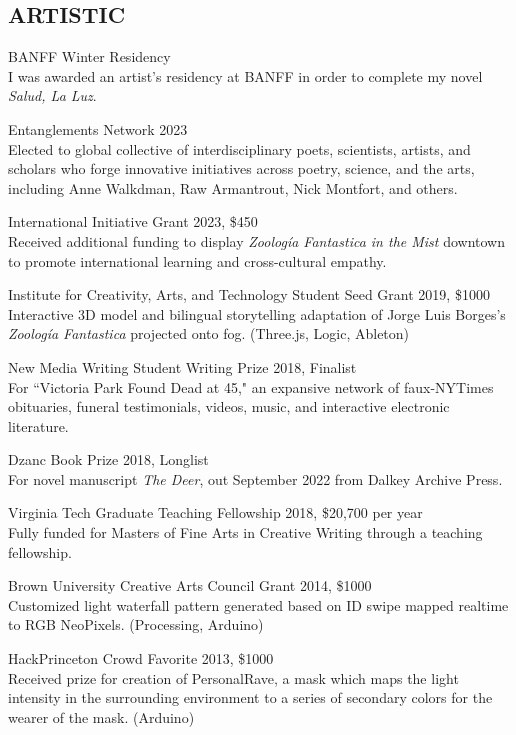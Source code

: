  \subsection{ARTISTIC}
BANFF Winter Residency \\
I was awarded an artist's residency at BANFF in order to complete my novel \emph{Salud, La Luz}.

 
Entanglements Network 2023 \\
 Elected to global collective of interdisciplinary poets, scientists, artists, and scholars who forge innovative initiatives across poetry, science, and the arts, including Anne Walkdman, Raw Armantrout, Nick Montfort, and others. 
 
 International Initiative Grant 2023, \$450  \\
Received additional funding to display \emph{Zoolog\'ia Fantastica in the Mist} downtown to promote international learning and cross-cultural empathy. 
 
 Institute for Creativity, Arts, and Technology Student Seed Grant 2019, \$1000  \\
Interactive 3D model and bilingual storytelling adaptation of Jorge Luis Borges's \emph{Zoolog\'ia Fantastica} projected onto fog. (Three.js, Logic, Ableton)

New Media Writing Student Writing Prize 2018, Finalist\\
For ``Victoria Park Found Dead at 45," an expansive network of faux-NYTimes obituaries, funeral testimonials, videos, music, and interactive electronic literature. 

Dzanc Book Prize 2018, Longlist \\
For novel manuscript \emph{The Deer}, out September 2022 from Dalkey Archive Press.

Virginia Tech Graduate Teaching Fellowship 2018, \$20,700 per year \\
Fully funded for Masters of Fine Arts in Creative Writing through a teaching fellowship.

Brown University Creative Arts Council Grant 2014, \$1000 \\
Customized light waterfall pattern generated based on ID swipe mapped realtime to RGB NeoPixels. (Processing, Arduino)

HackPrinceton Crowd Favorite 2013, \$1000 \\
Received prize for creation of PersonalRave, a mask which maps the light intensity in the surrounding environment to a series of secondary colors for the wearer of the mask. (Arduino)

